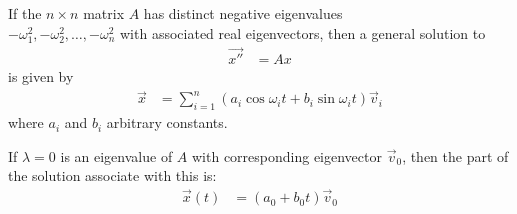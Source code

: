 \begin{theorem}
If the $n \times n$ matrix $A$ has distinct negative eigenvalues \\$-\omega_1^2, -\omega_2^2, \ldots, -\omega_n^2$ with associated real eigenvectors, then a general solution to 
%
\begin{align*}
\vec{x''} & = A x 
\end{align*}
is given by
\begin{align*}
\vec{x} & = \sum_{i=1}^n (a_i \cos \omega_i t + b_i \sin \omega_i t)\vec{v}_i
\end{align*}
where $a_i$ and $b_i$ arbitrary constants.  

If $\lambda = 0$ is an eigenvalue of $A$ with corresponding eigenvector $\vec{v}_0$, then the part of the solution associate with this is:
%
\begin{align*}
\vec{x}(t) & = (a_0 + b_0 t) \vec{v}_0
\end{align*}

\end{theorem}


